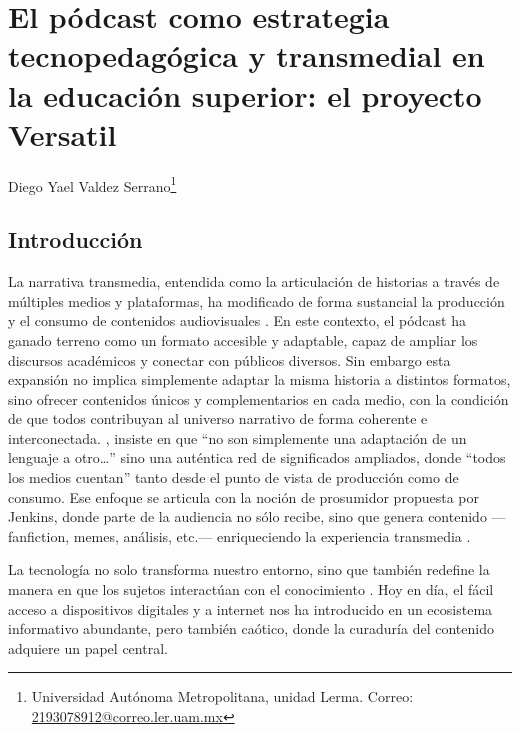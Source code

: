 \documentclass[
  spanish,
  11pt,
  a4paper,
]{scrbook}
\begin{document}
\chapter{El pódcast como estrategia tecnopedagógica y transmedial en la
educación superior: el proyecto
Versatil}\label{el-puxf3dcast-como-estrategia-tecnopedaguxf3gica-y-transmedial-en-la-educaciuxf3n-superior-el-proyecto-versatil}


\begin{flushright}
\Large Diego Yael Valdez Serrano\footnote{Universidad Autónoma Metropolitana, unidad Lerma. Correo: \href{2193078912@correo.ler.uam.mx}{2193078912@correo.ler.uam.mx}}
\end{flushright}

\section*{Introducción}\label{introducciuxf3n-3}


La narrativa transmedia, entendida como la articulación de historias a
través de múltiples medios y plataformas, ha modificado de forma
sustancial la producción y el consumo de contenidos audiovisuales
\autocite{Scolari2013}. En este contexto, el pódcast ha ganado terreno
como un formato accesible y adaptable, capaz de ampliar los discursos
académicos y conectar con públicos diversos. Sin embargo esta expansión
no implica simplemente adaptar la misma historia a distintos formatos,
sino ofrecer contenidos únicos y complementarios en cada medio, con la
condición de que todos contribuyan al universo narrativo de forma
coherente e interconectada. \textcite{Scolari2013}, insiste en que ``no
son simplemente una adaptación de un lenguaje a otro\ldots{}'' sino una
auténtica red de significados ampliados, donde ``todos los medios
cuentan'' tanto desde el punto de vista de producción como de consumo.
Ese enfoque se articula con la noción de prosumidor propuesta por
Jenkins, donde parte de la audiencia no sólo recibe, sino que genera
contenido ---fanfiction, memes, análisis, etc.--- enriqueciendo la
experiencia transmedia \autocite{Jenkins2008}.

La tecnología no solo transforma nuestro entorno, sino que también
redefine la manera en que los sujetos interactúan con el conocimiento
\autocite{Scolari2013}. Hoy en día, el fácil acceso a dispositivos
digitales y a internet nos ha introducido en un ecosistema informativo
abundante, pero también caótico, donde la curaduría del contenido
adquiere un papel central.
\end{document}
